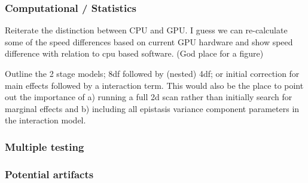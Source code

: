 \documentclass{article}
\begin{document}
\subsubsection{Computational / Statistics}

Reiterate the distinction between CPU and GPU. I guess we can re-calculate some of the speed differences based on current GPU hardware and show speed difference with relation to cpu based software. (God place for a figure)

Outline the 2 stage models; 8df followed by (nested) 4df; or initial correction for main effects followed by a interaction term. This would also be the place to point out the importance of a) running a full 2d scan rather than initially search for marginal effects and b) including all epistasis variance component parameters in the interaction model. 

\subsubsection{Multiple testing}



\subsubsection{Potential artifacts}
\end{document}

